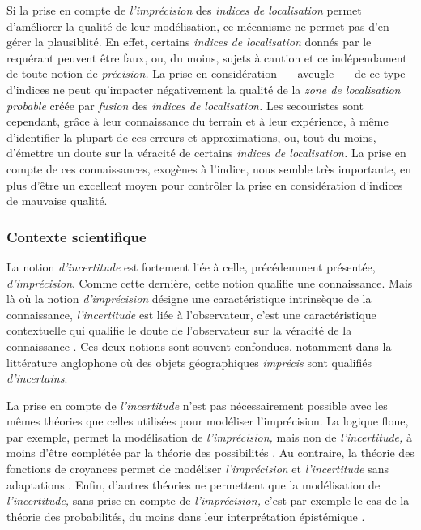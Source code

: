 Si la prise en compte de \emph{l'imprécision} des \emph{indices de
  localisation} permet d'améliorer la qualité de leur modélisation, ce
mécanisme ne permet pas d'en gérer la plausiblité. En effet, certains
\emph{indices de localisation} donnés par le requérant peuvent être
faux, ou, du moins, sujets à caution et ce indépendament de toute
notion de \emph{précision.} La prise en considération ---~aveugle~---
de ce type d'indices ne peut qu'impacter négativement la qualité de la
\emph{zone de localisation probable} créée par \emph{fusion} des
\emph{indices de localisation.} Les secouristes sont cependant, grâce
à leur connaissance du terrain et à leur expérience, à même
d'identifier la plupart de ces erreurs et approximations, ou, tout du
moins, d’émettre un doute sur la véracité de certains \emph{indices de
  localisation.} La prise en compte de ces connaissances, exogènes à
l'indice, nous semble très importante, en plus d'être un excellent
moyen pour contrôler la prise en considération d'indices de mauvaise
qualité.

\subsubsection{Contexte scientifique}

La notion \emph{d'incertitude} est fortement liée à celle,
précédemment présentée, \emph{d'imprécision}. Comme cette dernière,
cette notion qualifie une connaissance. Mais là où la notion
\emph{d'imprécision} désigne une caractéristique intrinsèque de la
connaissance, \emph{l'incertitude} est liée à l'observateur, c'est une
caractéristique contextuelle qui qualifie le doute de l'observateur
sur la véracité de la connaissance
\autocite{Bouchon-Meunier1995,Bouchon-Meunier2007}. Ces deux notions
sont souvent confondues, notamment dans la littérature anglophone où
des objets géographiques \emph{imprécis} sont qualifiés
\emph{d'incertains}.

La prise en compte de \emph{l'incertitude} n'est pas nécessairement
possible avec les mêmes théories que celles utilisées pour modéliser
l'imprécision. La logique floue, par exemple, permet la modélisation
de \emph{l'imprécision,} mais non de \emph{l'incertitude,} à moins
d'être complétée par la théorie des possibilités
\autocite{Bouchon-Meunier1995,Bouchon-Meunier2007}. Au contraire, la
théorie des fonctions de croyances permet de modéliser
\emph{l'imprécision} et \emph{l'incertitude} sans adaptations \autocite{Bouchon-Meunier1995,Bouchon-Meunier2007}. Enfin,
d'autres théories ne permettent que la modélisation de
\emph{l'incertitude,} sans prise en compte de \emph{l'imprécision,}
c'est par exemple le cas de la théorie des probabilités, du moins dans
leur interprétation épistémique \autocite{Hajek2019}.


